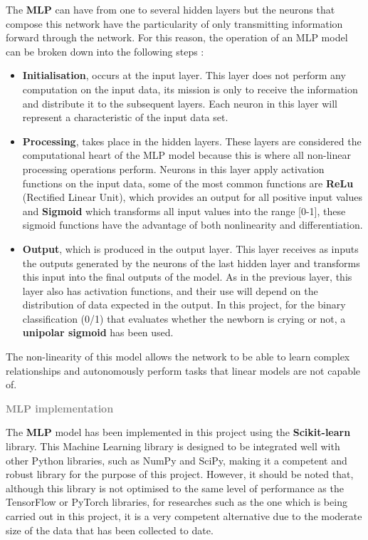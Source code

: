 \newpage

The \textbf{MLP} can have from one to several hidden layers but the neurons that compose this network have the particularity of only transmitting information forward through the network. For this reason, the operation of an MLP model can be broken down into the following steps \cite{popescu2019multilayer}: 
\begin{itemize}
    \item \textbf{Initialisation}, occurs at the input layer. This layer does not perform any computation on the input data, its mission is only to receive the information and distribute it to the subsequent layers. Each neuron in this layer will represent a characteristic of the input data set. 
    \item \textbf{Processing}, takes place in the hidden layers. These layers are considered the computational heart of the MLP model because this is where all non-linear processing operations perform. Neurons in this layer apply activation functions on the input data, some of the most common functions are \textbf{ReLu} (Rectified Linear Unit), which provides an output for all positive input values and \textbf{Sigmoid} which transforms all input values into the range [0-1], these sigmoid functions have the advantage of both nonlinearity and differentiation. 
    \item \textbf{Output}, which is produced in the output layer. This layer receives as inputs the outputs generated by the neurons of the last hidden layer and transforms this input into the final outputs of the model. As in the previous layer, this layer also has activation functions, and their use will depend on the distribution of data expected in the output. In this project, for the binary classification (0/1) that evaluates whether the newborn is crying or not, a \textbf{unipolar sigmoid} has been used. 
\end{itemize}

\vspace{\baselineskip}

\begin{tcolorbox}
The non-linearity of this model allows the network to be able to learn complex relationships and autonomously perform tasks that linear models are not capable of.
\end{tcolorbox}

\newpage
{\fontsize{16pt}{16pt}\textcolor{gray}{\textbf{MLP implementation}}}

The \textbf{MLP} model has been implemented in this project using the \textbf{Scikit-learn} library. This Machine Learning library is designed to be integrated well with other Python libraries, such as NumPy and SciPy, making it a competent and robust library for the purpose of this project. However, it should be noted that, although this library is not optimised to the same level of performance as the TensorFlow or PyTorch libraries, for researches such as the one which is being carried out in this project, it is a very competent alternative due to the moderate size of the data that has been collected to date. 
 
